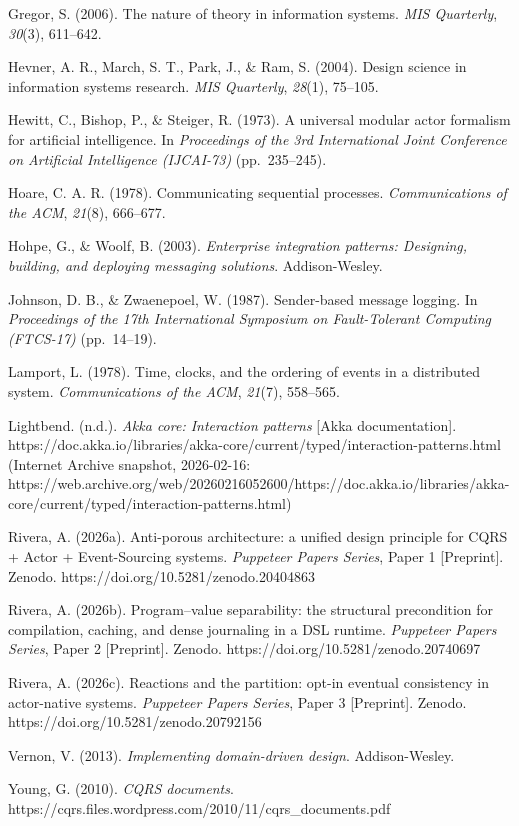 \documentclass[
]{article}
\begin{document}
Gregor, S. (2006). The nature of theory in information systems.
\emph{MIS Quarterly}, \emph{30}(3), 611--642.

Hevner, A. R., March, S. T., Park, J., \& Ram, S. (2004). Design science
in information systems research. \emph{MIS Quarterly}, \emph{28}(1),
75--105.

Hewitt, C., Bishop, P., \& Steiger, R. (1973). A universal modular actor
formalism for artificial intelligence. In \emph{Proceedings of the 3rd
International Joint Conference on Artificial Intelligence (IJCAI-73)}
(pp.~235--245).

Hoare, C. A. R. (1978). Communicating sequential processes.
\emph{Communications of the ACM}, \emph{21}(8), 666--677.

Hohpe, G., \& Woolf, B. (2003). \emph{Enterprise integration patterns:
Designing, building, and deploying messaging solutions}. Addison-Wesley.

Johnson, D. B., \& Zwaenepoel, W. (1987). Sender-based message logging.
In \emph{Proceedings of the 17th International Symposium on
Fault-Tolerant Computing (FTCS-17)} (pp.~14--19).

Lamport, L. (1978). Time, clocks, and the ordering of events in a
distributed system. \emph{Communications of the ACM}, \emph{21}(7),
558--565.

Lightbend. (n.d.). \emph{Akka core: Interaction patterns} {[}Akka
documentation{]}.
https://doc.akka.io/libraries/akka-core/current/typed/interaction-patterns.html
(Internet Archive snapshot, 2026-02-16:
https://web.archive.org/web/20260216052600/https://doc.akka.io/libraries/akka-core/current/typed/interaction-patterns.html)

Rivera, A. (2026a). Anti-porous architecture: a unified design principle
for CQRS + Actor + Event-Sourcing systems. \emph{Puppeteer Papers
Series}, Paper 1 {[}Preprint{]}. Zenodo.
https://doi.org/10.5281/zenodo.20404863

Rivera, A. (2026b). Program--value separability: the structural
precondition for compilation, caching, and dense journaling in a DSL
runtime. \emph{Puppeteer Papers Series}, Paper 2 {[}Preprint{]}. Zenodo.
https://doi.org/10.5281/zenodo.20740697

Rivera, A. (2026c). Reactions and the partition: opt-in eventual
consistency in actor-native systems. \emph{Puppeteer Papers Series},
Paper 3 {[}Preprint{]}. Zenodo. https://doi.org/10.5281/zenodo.20792156

Vernon, V. (2013). \emph{Implementing domain-driven design}.
Addison-Wesley.

Young, G. (2010). \emph{CQRS documents}.
https://cqrs.files.wordpress.com/2010/11/cqrs\_documents.pdf
\end{document}

